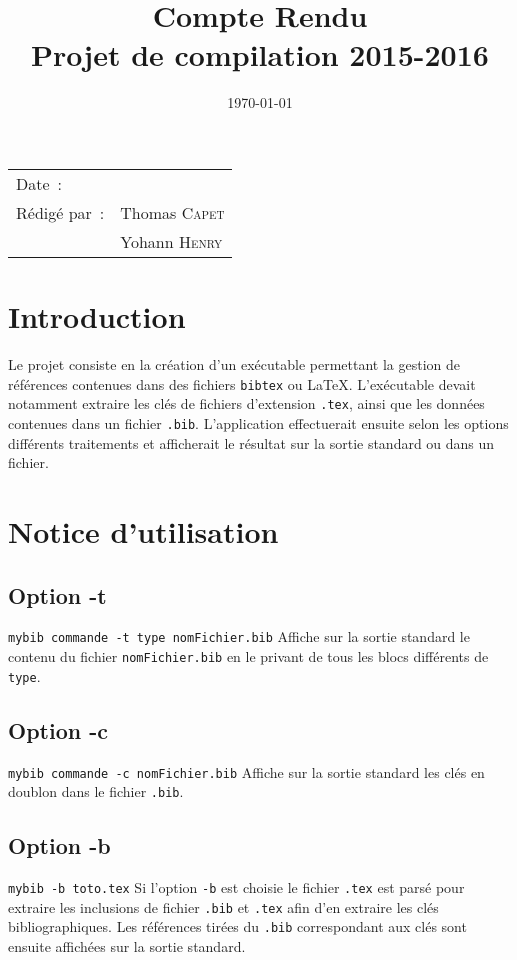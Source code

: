 \documentclass[hidelinks, a4paper,11pt,twoside,final]{article}
\title{\bfseries Compte Rendu \\ Projet de compilation 2015-2016}
\begin{document}
\maketitle
\begin{center}
\begin{tabular}{ll}
  Date~: & \date{\today}\\[.5em]
  Rédigé par~: & Thomas \textsc{Capet}\\
               & Yohann \textsc{Henry}\\
\end{tabular}
\end{center}

\newpage

\newpage
\tableofcontents

\newpage

\section{Introduction}
Le projet consiste en la création d'un exécutable permettant la gestion de références contenues dans des fichiers \texttt{bibtex} ou \LaTeX.
L'exécutable devait notamment extraire les clés de fichiers d'extension \texttt{.tex}, ainsi que les données contenues dans un fichier \texttt{.bib}.
L'application effectuerait ensuite selon les options différents traitements et afficherait le résultat sur la sortie standard ou dans un fichier.

\section{Notice d'utilisation}
\subsection{Option -t}
\texttt{mybib commande -t type nomFichier.bib}
\newline
Affiche sur la sortie standard le contenu du fichier \texttt{nomFichier.bib} 
en le privant de tous les blocs différents de \texttt{type}.

\subsection{Option -c}
\texttt{mybib commande -c nomFichier.bib}
\newline
Affiche sur la sortie standard les clés en doublon dans le fichier \texttt{.bib}.

\subsection{Option -b}
\texttt{mybib -b toto.tex}
\newline
Si l'option \texttt{-b} est choisie le fichier \texttt{.tex} est parsé pour extraire les inclusions de fichier \texttt{.bib} et \texttt{.tex}
afin d'en extraire les clés bibliographiques. 
Les références tirées du \texttt{.bib} correspondant aux clés sont ensuite affichées sur la sortie standard.
\end{document}
